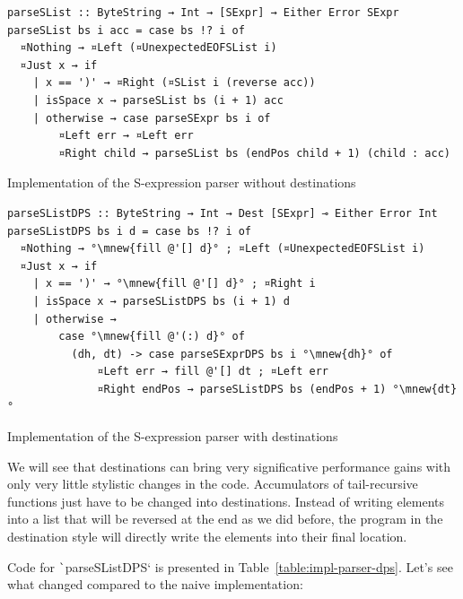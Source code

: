 \documentclass[english]{jflart}
\newcommand{\mnew}[1]{\colorbox{green!50}{#1}}
\begin{document}
\begin{table}[t]
\small
\begin{verbatim}
parseSList :: ByteString → Int → [SExpr] → Either Error SExpr
parseSList bs i acc = case bs !? i of
  ¤Nothing → ¤Left (¤UnexpectedEOFSList i)
  ¤Just x → if
    | x == ')' → ¤Right (¤SList i (reverse acc))
    | isSpace x → parseSList bs (i + 1) acc
    | otherwise → case parseSExpr bs i of
        ¤Left err → ¤Left err
        ¤Right child → parseSList bs (endPos child + 1) (child : acc)
\end{verbatim}
\caption{Implementation of the S-expression parser without destinations}
\label{table:impl-parser-naive}

\bigskip

\small
\begin{verbatim}
parseSListDPS :: ByteString → Int → Dest [SExpr] ⊸ Either Error Int
parseSListDPS bs i d = case bs !? i of
  ¤Nothing → °\mnew{fill @'[] d}° ; ¤Left (¤UnexpectedEOFSList i)
  ¤Just x → if
    | x == ')' → °\mnew{fill @'[] d}° ; ¤Right i
    | isSpace x → parseSListDPS bs (i + 1) d
    | otherwise →
        case °\mnew{fill @'(:) d}° of
          (dh, dt) -> case parseSExprDPS bs i °\mnew{dh}° of
              ¤Left err → fill @'[] dt ; ¤Left err
              ¤Right endPos → parseSListDPS bs (endPos + 1) °\mnew{dt}°
\end{verbatim}
\caption{Implementation of the S-expression parser with destinations}
\label{table:impl-parser-dps}
\end{table}

We will see that destinations can bring very significative performance gains with only very little stylistic changes in the code. Accumulators of tail-recursive functions just have to be changed into destinations. Instead of writing elements into a list that will be reversed at the end as we did before, the program in the destination style will directly write the elements into their final location.

Code for \texttt`parseSListDPS` is presented in Table~\ref{table:impl-parser-dps}. Let's see what changed compared to the naive implementation:
\end{document}
